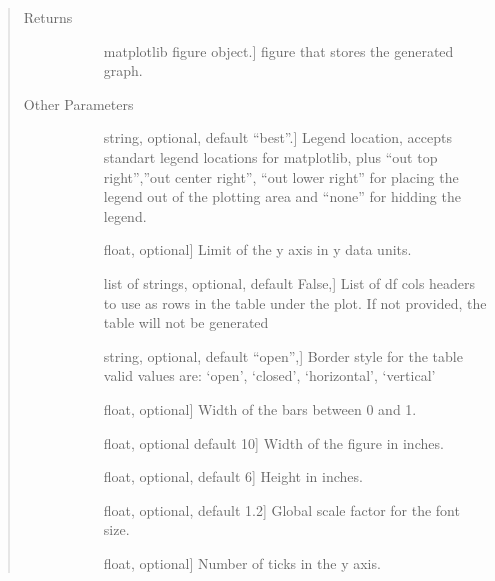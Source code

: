 \documentclass[letterpaper,10pt,english]{sphinxmanual}
\begin{document}
\begin{fulllineitems}
\begin{quote}
\begin{description}
\item[{Returns}] \leavevmode\begin{description}
\item[{}] \leavevmode{[}matplotlib figure object.{]}
figure that stores the generated graph.

\end{description}

\item[{Other Parameters}] \leavevmode\begin{description}
\item[{}] \leavevmode{[}string, optional, default “best”.{]}
Legend location, accepts standart legend locations 
for matplotlib, plus “out top right”,”out center right”, 
“out lower right” for placing the legend out of 
the plotting area and “none” for hidding the legend.

\item[{}] \leavevmode{[}float, optional{]}
Limit of the y axis in y data units.

\item[{}] \leavevmode{[}list of strings, optional, default False,{]}
List of df cols headers to use as rows 
in the table under the plot. 
If not provided, the table will not be generated

\item[{}] \leavevmode{[}string, optional, default “open”,{]}
Border style for the table 
valid values are: ‘open’, ‘closed’, ‘horizontal’, ‘vertical’

\item[{}] \leavevmode{[}float, optional{]}
Width of the bars between 0 and 1.

\item[{}] \leavevmode{[}float, optional default 10{]}
Width of the figure in inches.

\item[{}] \leavevmode{[}float, optional, default 6{]}
Height in inches.

\item[{}] \leavevmode{[}float, optional, default 1.2{]}
Global scale factor for the font size.

\item[{}] \leavevmode{[}float, optional{]}
Number of ticks in the y axis.


\end{description}
\end{description}
\end{quote}
\end{fulllineitems}
\end{document}
